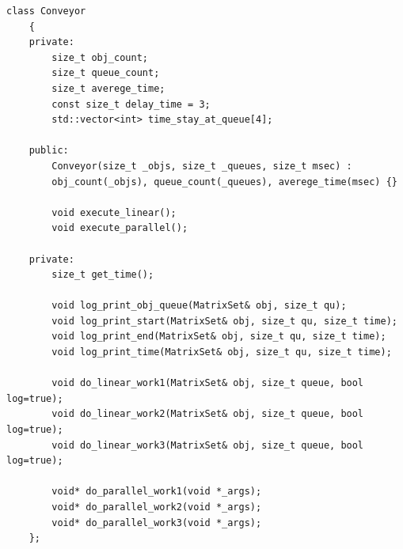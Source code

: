 \documentclass[12pt, a4paper]{report}
\begin{document}
	\begin{lstlisting}[label=code:conv,caption=Класс конвейера]
	class Conveyor
	{
	private:
		size_t obj_count;
		size_t queue_count;
		size_t averege_time;
		const size_t delay_time = 3;
		std::vector<int> time_stay_at_queue[4];
	
	public:
		Conveyor(size_t _objs, size_t _queues, size_t msec) :
		obj_count(_objs), queue_count(_queues), averege_time(msec) {}
		
		void execute_linear();
		void execute_parallel();
	
	private:
		size_t get_time();
		
		void log_print_obj_queue(MatrixSet& obj, size_t qu);
		void log_print_start(MatrixSet& obj, size_t qu, size_t time);
		void log_print_end(MatrixSet& obj, size_t qu, size_t time);
		void log_print_time(MatrixSet& obj, size_t qu, size_t time);
		
		void do_linear_work1(MatrixSet& obj, size_t queue, bool log=true);
		void do_linear_work2(MatrixSet& obj, size_t queue, bool log=true);
		void do_linear_work3(MatrixSet& obj, size_t queue, bool log=true);
		
		void* do_parallel_work1(void *_args);
		void* do_parallel_work2(void *_args);
		void* do_parallel_work3(void *_args);
	};
	\end{lstlisting}
\end{document}
